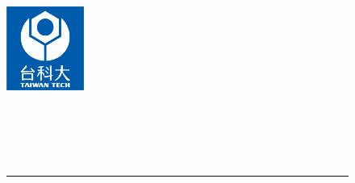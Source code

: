 \begin{titlepage}

\begin{center}

\begin{figure}[htbp]
	\begin{minipage}[b]{5cm} 
	\raggedright
	\includegraphics[width=1in]{figures/ntust_logo.jpg}
	\label{fig:ntust_logo}
	\end{minipage}%
	\begin{minipage}[b]{0.5\textwidth} 
	\centering
	\makebox[3cm][c]{\Huge{\univCname}}\\  %
	\vspace{0.5cm}
	\makebox[3cm][c]{\Huge{\deptCname}}\\ %
	\vspace{0.5cm}
	\end{minipage}%
\\ 
\rule{16cm}{3pt}
\end{figure}
\hfill


\vspace{2.5cm}
\\ %
\vspace{2.5cm}
%
\renewcommand{\baselinestretch}{1}   %
\Large{\cTitle}\\  %
%
\vspace{1cm}
%
\Large{\eTitle}\\ %
\vspace{1cm}
\vspace{1cm} 
\Large{\myEname}  %

\vspace{0.5cm} 
\Large{\myStudentID}  %

\vspace{1cm}
%


\end{center}
\end{titlepage}
